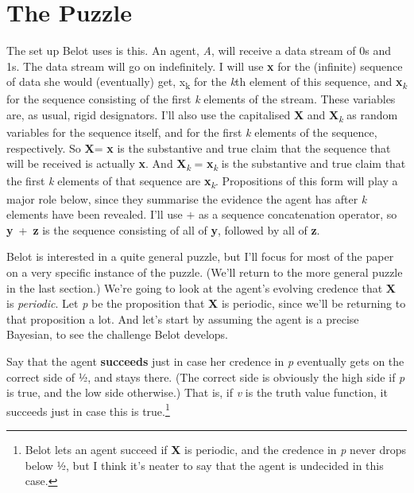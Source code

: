 \documentclass[
  11pt,
  letterpaper,
  DIV=11,
  numbers=noendperiod,
  twoside]{scrartcl}
\begin{document}
\section{The Puzzle}\label{the-puzzle}

The set up Belot uses is this. An agent, \emph{A}, will receive a data
stream of 0s and 1s. The data stream will go on indefinitely. I will use
\textbf{x} for the (infinite) sequence of data she would (eventually)
get, x\textsubscript{k} for the \emph{k}th element of this sequence, and
\textbf{x}\textsubscript{\emph{k}} for the sequence consisting of the
first \emph{k} elements of the stream. These variables are, as usual,
rigid designators. I'll also use the capitalised \textbf{X} and
\textbf{X}\textsubscript{\emph{k}} as random variables for the sequence
itself, and for the first \emph{k} elements of the sequence,
respectively. So \textbf{X}= \textbf{x} is the substantive and true
claim that the sequence that will be received is actually \textbf{x}.
And \textbf{X}\textsubscript{\emph{k}} =
\textbf{x}\textsubscript{\emph{k}} is the substantive and true claim
that the first \emph{k} elements of that sequence are
\textbf{x}\textsubscript{\emph{k}}. Propositions of this form will play
a major role below, since they summarise the evidence the agent has
after \emph{k} elements have been revealed. I'll use \(+\) as a sequence
concatenation operator, so \textbf{y}~+~\textbf{z} is the sequence
consisting of all of \textbf{y}, followed by all of \textbf{z}.

Belot is interested in a quite general puzzle, but I'll focus for most
of the paper on a very specific instance of the puzzle. (We'll return to
the more general puzzle in the last section.) We're going to look at the
agent's evolving credence that \textbf{X} is \emph{periodic}. Let
\emph{p} be the proposition that \textbf{X} is periodic, since we'll be
returning to that proposition a lot. And let's start by assuming the
agent is a precise Bayesian, to see the challenge Belot develops.

Say that the agent \textbf{succeeds} just in case her credence in
\emph{p} eventually gets on the correct side of ½, and stays there. (The
correct side is obviously the high side if \emph{p} is true, and the low
side otherwise.) That is, if \emph{v} is the truth value function, it
succeeds just in case this is true.\footnote{Belot lets an agent succeed
  if \textbf{X} is periodic, and the credence in \emph{p} never drops
  below ½, but I think it's neater to say that the agent is undecided in
  this case.}
\end{document}
